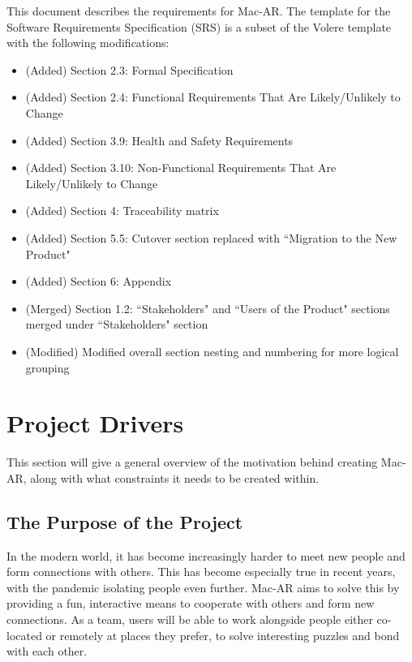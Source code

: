 \documentclass[12pt]{article}
\begin{document}
\newpage


This document describes the requirements for Mac-AR. The template for the Software Requirements
Specification (SRS) is a subset of the Volere template~\citep{RobertsonAndRobertson2012} with the following modifications:
\begin{itemize}
    \item (Added) Section 2.3: Formal Specification
    \item (Added) Section 2.4: Functional Requirements That Are Likely/Unlikely to Change
    \item (Added) Section 3.9: Health and Safety Requirements
    \item (Added) Section 3.10: Non-Functional Requirements That Are Likely/Unlikely to Change
    \item (Added) Section 4: Traceability matrix
    \item (Added) Section 5.5: Cutover section replaced with ``Migration to the New Product"
    \item (Added) Section 6: Appendix
    \item (Merged) Section 1.2: ``Stakeholders" and ``Users of the Product" sections merged under ``Stakeholders" section
    \item (Modified) Modified overall section nesting and numbering for more logical grouping
\end{itemize}

\section{Project Drivers}

This section will give a general overview of the motivation behind creating Mac-AR, along with what constraints it needs to be created within. 

\subsection{The Purpose of the Project}
In the modern world, it has become increasingly harder to meet new people and form connections with others. This has become especially true in recent years, with the pandemic isolating people even further. Mac-AR aims to solve this by providing a fun, interactive means to cooperate with others and form new connections. As a team, users will be able to work alongside people either co-located or remotely at places they prefer, to solve interesting puzzles and bond with each other.
\end{document}

